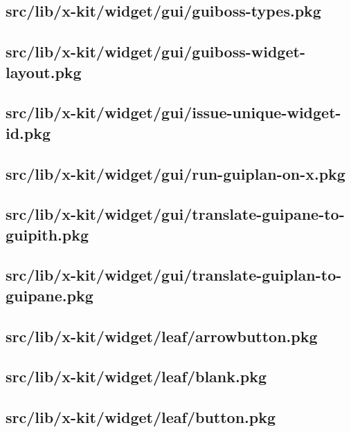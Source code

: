 \subsection{src/lib/x-kit/widget/gui/guiboss-types.pkg}


\subsection{src/lib/x-kit/widget/gui/guiboss-widget-layout.pkg}


\subsection{src/lib/x-kit/widget/gui/issue-unique-widget-id.pkg}


\subsection{src/lib/x-kit/widget/gui/run-guiplan-on-x.pkg}


\subsection{src/lib/x-kit/widget/gui/translate-guipane-to-guipith.pkg}


\subsection{src/lib/x-kit/widget/gui/translate-guiplan-to-guipane.pkg}


\subsection{src/lib/x-kit/widget/leaf/arrowbutton.pkg}


\subsection{src/lib/x-kit/widget/leaf/blank.pkg}


\subsection{src/lib/x-kit/widget/leaf/button.pkg}



